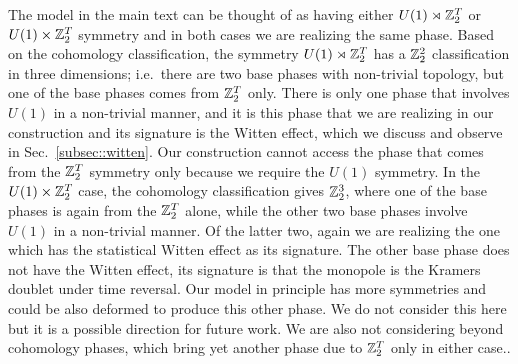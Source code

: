 The model in the main text can be thought of as having either $U(1)\rtimes\mathbb{Z}_2^T$ or $U(1)\times\mathbb{Z}_2^T$ symmetry and in both cases we are realizing the same phase.
Based on the cohomology classification\cite{WenScience,WenPRB}, the symmetry $U(1)\rtimes\mathbb{Z}_2^T$ has a $\mathbb{Z}_2^2$ classification in three dimensions; i.e.~there are two base phases with non-trivial topology, but one of the base phases comes from $\mathbb{Z}_2^T$ only.  There is only one phase that involves $U(1)$ in a non-trivial manner, and it is this phase that we are realizing in our construction and its signature is the Witten effect, which we discuss and observe in Sec.~\ref{subsec::witten}. Our construction cannot access the phase that comes from the $\mathbb{Z}_2^T$ symmetry only because we require the $U(1)$ symmetry.
In the $U(1) \times \mathbb{Z}_2^T$ case, the cohomology classification gives $\mathbb{Z}_2^3$, where one of the base phases is again from the $\mathbb{Z}_2^T$ alone, while the other two base phases involve $U(1)$ in a non-trivial manner.  Of the latter two, again we are realizing the one which has the statistical Witten effect as its signature.  The other base phase does not have the Witten effect, its signature is that the monopole is the Kramers doublet under time reversal.\cite{SenthilVishwanath, BiRasmussenXu}  Our model in principle has more symmetries and could be also deformed to produce this other phase. We do not consider this here but it is a possible direction for future work.  We are also not considering beyond cohomology phases, which bring yet another phase due to $\mathbb{Z}_2^T$ only in either case.\cite{SenthilVishwanath, Kapustin2014}. 






